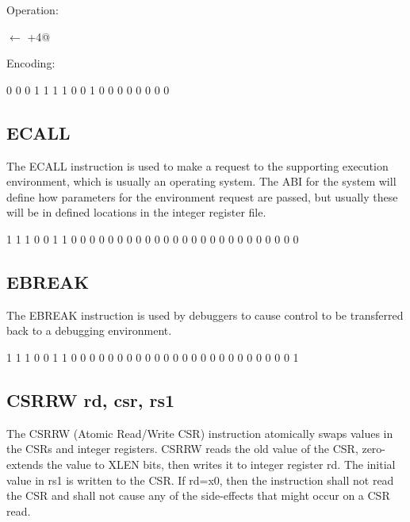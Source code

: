 Operation:

\verb@pc@ $\leftarrow$ \verb@pc+4@

Encoding:

{0 0 0 1 1 1 1}		%
{0 0 1}				%
{0 0 0 0}			%
{0 0 0 0}			%


\subsection{ECALL}

The ECALL instruction is used to make a request to the supporting 
execution environment, which is usually an operating system. The ABI 
for the system will define how parameters for the environment
request are passed, but usually these will be in defined locations 
in the integer register file.~\cite[p.~24]{rvismv1v22:2017}

{1 1 1 0 0 1 1}
{0 0 0 0 0}
{0 0 0}
{0 0 0 0 0}
{0 0 0 0 0 0 0 0 0 0 0 0}


\subsection{EBREAK}

The EBREAK instruction is used by debuggers to cause control to be 
transferred back to a debugging environment.~\cite[p.~24]{rvismv1v22:2017}

{1 1 1 0 0 1 1}
{0 0 0 0 0}
{0 0 0}
{0 0 0 0 0}
{0 0 0 0 0 0 0 0 0 0 0 1}

\subsection{CSRRW rd, csr, rs1}

The CSRRW (Atomic Read/Write CSR) instruction atomically swaps values in 
the CSRs and integer registers. CSRRW reads the old value of the CSR, 
zero-extends the value to XLEN bits, then writes it to integer register rd. 
The initial value in rs1 is written to the CSR. If rd=x0, then the 
instruction shall not read the CSR and shall not cause any of the 
side-effects that might occur on a CSR read.~\cite[p.~22]{rvismv1v22:2017}

